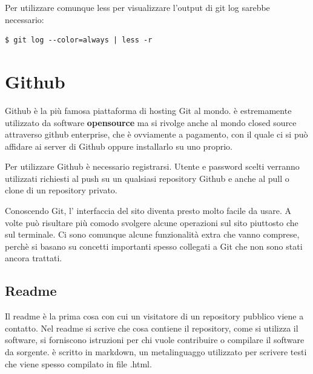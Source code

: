 \documentclass{article}
\begin{document}
Per utilizzare comunque less per visualizzare l'output di git log sarebbe
necessario:

\begin{verbatim}
$ git log --color=always | less -r 
\end{verbatim}

\section{Github\label{github}}
Github è la più famosa piattaforma di hosting Git al mondo. è estremamente
utilizzato da software \textbf{opensource} ma si rivolge anche al mondo closed
source attraverso github enterprise, che è ovviamente a pagamento, con il quale
ci si può affidare ai server di Github oppure installarlo su uno proprio.

Per utilizzare Github è necessario registrarsi. Utente e password scelti
verranno utilizzati richiesti al push su un qualsiasi repository Github e anche
al pull o clone di un repository privato.

Conoscendo Git, l' interfaccia del sito diventa presto molto facile da usare.
A volte può risultare più comodo svolgere alcune operazioni sul sito piuttosto
che sul terminale.
Ci sono comunque alcune funzionalità extra che vanno comprese, perchè si basano su
concetti importanti spesso collegati a Git che non sono stati ancora trattati.

\subsection{Readme\label{readme}}
Il readme è la prima cosa con cui un visitatore di un repository pubblico viene
a contatto. Nel readme si scrive che cosa contiene il repository, come si
utilizza il software, si forniscono istruzioni per chi vuole contribuire o 
compilare il software da sorgente.
è scritto in markdown, un metalinguaggo utilizzato per scrivere testi che viene
spesso compilato in file .html.
\end{document}
